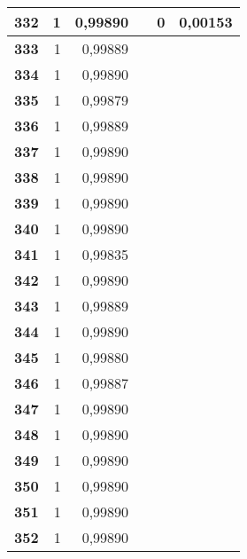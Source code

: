 \begin{longtable}{|r|r|r|l|r|r|}
\textbf{332} & 1 & 0,99890 &  & 0 & 0,00153 \\ \hline
\textbf{333} & 1 & 0,99889 &  & \multicolumn{1}{l|}{} & \multicolumn{1}{l|}{} \\ \hline
\textbf{334} & 1 & 0,99890 &  & \multicolumn{1}{l|}{} & \multicolumn{1}{l|}{} \\ \hline
\textbf{335} & 1 & 0,99879 &  & \multicolumn{1}{l|}{} & \multicolumn{1}{l|}{} \\ \hline
\textbf{336} & 1 & 0,99889 &  & \multicolumn{1}{l|}{} & \multicolumn{1}{l|}{} \\ \hline
\textbf{337} & 1 & 0,99890 &  & \multicolumn{1}{l|}{} & \multicolumn{1}{l|}{} \\ \hline
\textbf{338} & 1 & 0,99890 &  & \multicolumn{1}{l|}{} & \multicolumn{1}{l|}{} \\ \hline
\textbf{339} & 1 & 0,99890 &  & \multicolumn{1}{l|}{} & \multicolumn{1}{l|}{} \\ \hline
\textbf{340} & 1 & 0,99890 &  & \multicolumn{1}{l|}{} & \multicolumn{1}{l|}{} \\ \hline
\textbf{341} & 1 & 0,99835 &  & \multicolumn{1}{l|}{} & \multicolumn{1}{l|}{} \\ \hline
\textbf{342} & 1 & 0,99890 &  & \multicolumn{1}{l|}{} & \multicolumn{1}{l|}{} \\ \hline
\textbf{343} & 1 & 0,99889 &  & \multicolumn{1}{l|}{} & \multicolumn{1}{l|}{} \\ \hline
\textbf{344} & 1 & 0,99890 &  & \multicolumn{1}{l|}{} & \multicolumn{1}{l|}{} \\ \hline
\textbf{345} & 1 & 0,99880 &  & \multicolumn{1}{l|}{} & \multicolumn{1}{l|}{} \\ \hline
\textbf{346} & 1 & 0,99887 &  & \multicolumn{1}{l|}{} & \multicolumn{1}{l|}{} \\ \hline
\textbf{347} & 1 & 0,99890 &  & \multicolumn{1}{l|}{} & \multicolumn{1}{l|}{} \\ \hline
\textbf{348} & 1 & 0,99890 &  & \multicolumn{1}{l|}{} & \multicolumn{1}{l|}{} \\ \hline
\textbf{349} & 1 & 0,99890 &  & \multicolumn{1}{l|}{} & \multicolumn{1}{l|}{} \\ \hline
\textbf{350} & 1 & 0,99890 &  & \multicolumn{1}{l|}{} & \multicolumn{1}{l|}{} \\ \hline
\textbf{351} & 1 & 0,99890 &  & \multicolumn{1}{l|}{} & \multicolumn{1}{l|}{} \\ \hline
\textbf{352} & 1 & 0,99890 &  & \multicolumn{1}{l|}{} & \multicolumn{1}{l|}{} \\ \hline

\end{longtable}
